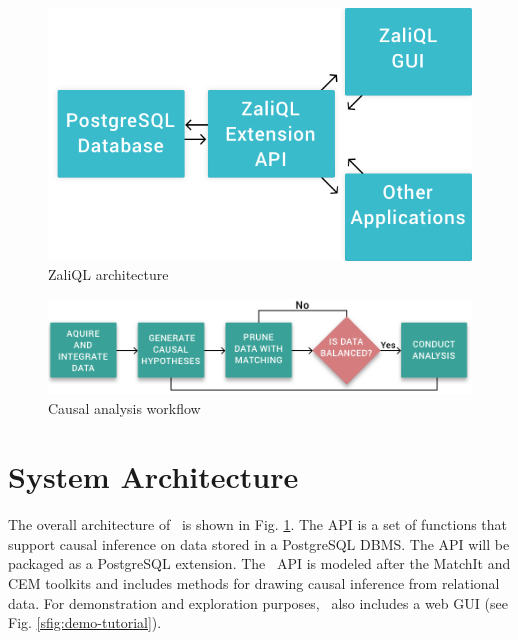 \begin{figure}\center
 \includegraphics[scale=0.20]{Figures/System-Overview.png}
  \vspace{-3.3mm} \caption{ZaliQL architecture}

  \label{fig:arch}
  \vspace{-3mm}
\end{figure}


\begin{figure} \center
  \includegraphics[scale=0.21]{Figures/Matching-Flowchart.png}
  \vspace{-3mm}\caption{Causal analysis workflow}

\label{fig:flowchart}
\vspace{-0.3cm}
\end{figure}

\vspace{-.3cm}

\section{System Architecture}

The overall architecture of \GSQL\ is shown in Fig. \ref{fig:arch}.
The API is a set of functions that support causal inference on data stored in a PostgreSQL DBMS. %
The API will be packaged as a PostgreSQL extension. %
The \GSQL\ API is modeled after the MatchIt and CEM toolkits
\cite{ho2005,iacus2009cem} and includes methods for drawing causal inference from relational data. For demonstration and exploration purposes, \GSQL\ also includes a web GUI
(see Fig. \ref{sfig:demo-tutorial}). %

